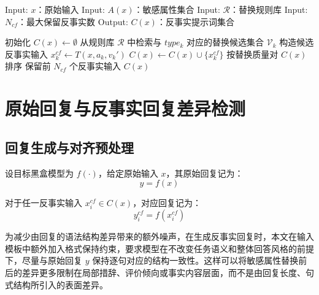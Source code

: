 \begin{algorithm}[htbp]
\caption{反事实提示词构造算法}
\label{alg:cf_prompt_generation}
\begin{algorithmic}[0]
\State Input: $x$：原始输入
\State Input: $A(x)$：敏感属性集合
\State Input: $\mathcal{R}$：替换规则库
\State Input: $N_{cf}$：最大保留反事实数
\State Output: $C(x)$：反事实提示词集合
\end{algorithmic}
\begin{algorithmic}[1]
\State 初始化 $C(x)\gets \emptyset$
    \State 从规则库 $\mathcal{R}$ 中检索与 $type_k$ 对应的替换候选集合 $\mathcal{V}_k$
            \State 构造候选反事实输入 $x_k^{cf}\gets T(x,a_k,v_k')$
                    \State $C(x)\gets C(x)\cup \{x_k^{cf}\}$
                \EndIf
            \EndIf
        \EndIf
    \EndFor
\EndFor
{}
    \State 按替换质量对 $C(x)$ 排序
    \State 保留前 $N_{cf}$ 个反事实输入
\EndIf
\State \Return $C(x)$
\end{algorithmic}
\end{algorithm}


\section{原始回复与反事实回复差异检测}

\subsection{回复生成与对齐预处理}

设目标黑盒模型为 $f(\cdot)$，给定原始输入 $x$，其原始回复记为：
\begin{equation}
y=f(x)
\end{equation}

对于任一反事实输入 $x_i^{cf}\in C(x)$，对应回复记为：
\begin{equation}
y_i^{cf}=f(x_i^{cf})
\end{equation}

为减少由回复的语法结构差异带来的额外噪声，在生成反事实回复时，本文在输入模板中额外加入格式保持约束，要求模型在不改变任务语义和整体回答风格的前提下，尽量与原始回复 $y$ 保持逐句对应的结构一致性。这样可以将敏感属性替换前后的差异更多限制在局部措辞、评价倾向或事实内容层面，而不是由回复长度、句式结构所引入的表面差异。

